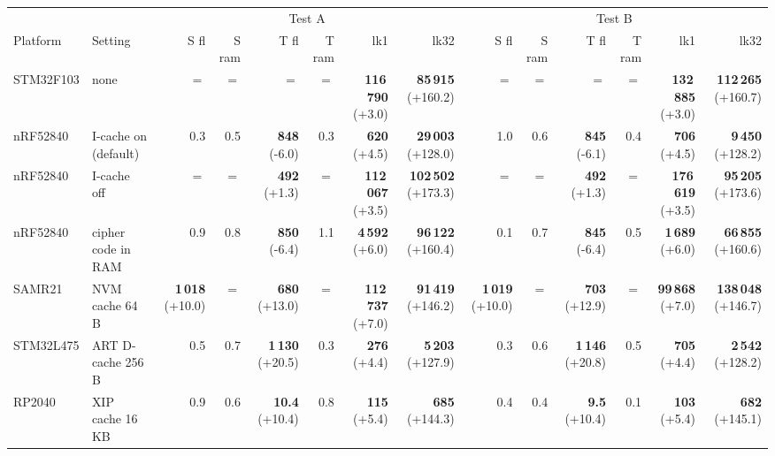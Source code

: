 \begin{tabular}{llrrrrrr|rrrrrr}
\hline
 & & \multicolumn{6}{c|}{Test A} & \multicolumn{6}{c}{Test B}\\
Platform & Setting & S fl & S ram & T fl & T ram & lk1 & lk32 & S fl & S ram & T fl & T ram & lk1 & lk32\\
\hline
STM32F103 & none & $=$ & $=$ & $=$ & $=$ & \textbf{116\,790} {\scriptsize(+3.0)} & \textbf{85\,915} {\scriptsize(+160.2)} & $=$ & $=$ & $=$ & $=$ & \textbf{132\,885} {\scriptsize(+3.0)} & \textbf{112\,265} {\scriptsize(+160.7)}\\
nRF52840 & I-cache on (default) & 0.3 & 0.5 & \textbf{848} {\scriptsize(-6.0)} & 0.3 & \textbf{620} {\scriptsize(+4.5)} & \textbf{29\,003} {\scriptsize(+128.0)} & 1.0 & 0.6 & \textbf{845} {\scriptsize(-6.1)} & 0.4 & \textbf{706} {\scriptsize(+4.5)} & \textbf{9\,450} {\scriptsize(+128.2)}\\
nRF52840 & I-cache off & $=$ & $=$ & \textbf{492} {\scriptsize(+1.3)} & $=$ & \textbf{112\,067} {\scriptsize(+3.5)} & \textbf{102\,502} {\scriptsize(+173.3)} & $=$ & $=$ & \textbf{492} {\scriptsize(+1.3)} & $=$ & \textbf{176\,619} {\scriptsize(+3.5)} & \textbf{95\,205} {\scriptsize(+173.6)}\\
nRF52840 & cipher code in RAM & 0.9 & 0.8 & \textbf{850} {\scriptsize(-6.4)} & 1.1 & \textbf{4\,592} {\scriptsize(+6.0)} & \textbf{96\,122} {\scriptsize(+160.4)} & 0.1 & 0.7 & \textbf{845} {\scriptsize(-6.4)} & 0.5 & \textbf{1\,689} {\scriptsize(+6.0)} & \textbf{66\,855} {\scriptsize(+160.6)}\\
SAMR21 & NVM cache 64\,B & \textbf{1\,018} {\scriptsize(+10.0)} & $=$ & \textbf{680} {\scriptsize(+13.0)} & $=$ & \textbf{112\,737} {\scriptsize(+7.0)} & \textbf{91\,419} {\scriptsize(+146.2)} & \textbf{1\,019} {\scriptsize(+10.0)} & $=$ & \textbf{703} {\scriptsize(+12.9)} & $=$ & \textbf{99\,868} {\scriptsize(+7.0)} & \textbf{138\,048} {\scriptsize(+146.7)}\\
STM32L475 & ART D-cache 256\,B & 0.5 & 0.7 & \textbf{1\,130} {\scriptsize(+20.5)} & 0.3 & \textbf{276} {\scriptsize(+4.4)} & \textbf{5\,203} {\scriptsize(+127.9)} & 0.3 & 0.6 & \textbf{1\,146} {\scriptsize(+20.8)} & 0.5 & \textbf{705} {\scriptsize(+4.4)} & \textbf{2\,542} {\scriptsize(+128.2)}\\
RP2040 & XIP cache 16\,KB & 0.9 & 0.6 & \textbf{10.4} {\scriptsize(+10.4)} & 0.8 & \textbf{115} {\scriptsize(+5.4)} & \textbf{685} {\scriptsize(+144.3)} & 0.4 & 0.4 & \textbf{9.5} {\scriptsize(+10.4)} & 0.1 & \textbf{103} {\scriptsize(+5.4)} & \textbf{682} {\scriptsize(+145.1)}\\
\hline
\end{tabular}
